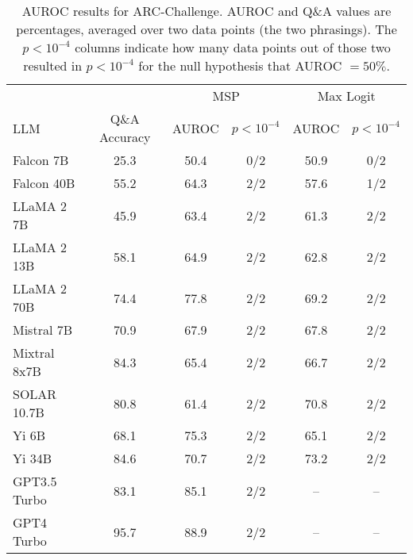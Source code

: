 \begin{table*}[!h]
\centering
\caption{AUROC results for ARC-Challenge. AUROC and Q\&A values are percentages, averaged over two data points (the two phrasings). The $p < 10^{-4}$ columns indicate how many data points out of those two resulted in $p< 10^{-4}$ for the null hypothesis that AUROC $= 50\%$.}
\label{tab:arc_auroc}
\begin{tabular}{lccccc}
\toprule
& & \multicolumn{2}{c}{MSP} & \multicolumn{2}{c}{Max Logit} \\ 
LLM & Q\&A Accuracy & AUROC & $p < 10^{-4}$ & AUROC & $p < 10^{-4}$\\ 
\cmidrule(lr){1-1} \cmidrule(lr){2-2} \cmidrule(lr){3-4} \cmidrule(lr){5-6}
Falcon 7B & 25.3 & 50.4 & 0/2 & 50.9 & 0/2 \\
Falcon 40B & 55.2 & 64.3 & 2/2 & 57.6 & 1/2 \\
LLaMA 2 7B & 45.9 & 63.4 & 2/2 & 61.3 & 2/2 \\
LLaMA 2 13B & 58.1 & 64.9 & 2/2 & 62.8 & 2/2 \\
LLaMA 2 70B & 74.4 & 77.8 & 2/2 & 69.2 & 2/2 \\
Mistral 7B & 70.9 & 67.9 & 2/2 & 67.8 & 2/2 \\
Mixtral 8x7B & 84.3 & 65.4 & 2/2 & 66.7 & 2/2 \\
SOLAR 10.7B & 80.8 & 61.4 & 2/2 & 70.8 & 2/2 \\
Yi 6B & 68.1 & 75.3 & 2/2 & 65.1 & 2/2 \\
Yi 34B & 84.6 & 70.7 & 2/2 & 73.2 & 2/2 \\
GPT3.5 Turbo & 83.1 & 85.1 & 2/2 & -- & -- \\
GPT4 Turbo & 95.7 & 88.9 & 2/2 & -- & -- \\
\bottomrule
\end{tabular}
\end{table*}